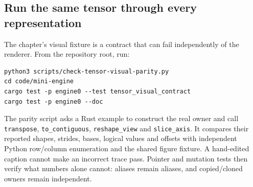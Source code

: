 \documentclass[
  10pt,
]{article}
\begin{document}
\subsection{Run the same tensor through every
representation}\label{run-the-same-tensor-through-every-representation}

The chapter's visual fixture is a contract that can fail independently
of the renderer. From the repository root, run:

\begin{verbatim}
python3 scripts/check-tensor-visual-parity.py
cd code/mini-engine
cargo test -p engine0 --test tensor_visual_contract
cargo test -p engine0 --doc
\end{verbatim}

The parity script asks a Rust example to construct the real owner and
call \texttt{transpose}, \texttt{to\_contiguous}, \texttt{reshape\_view}
and \texttt{slice\_axis}. It compares their reported shapes, strides,
bases, logical values and offsets with independent Python row/column
enumeration and the shared figure fixture. A hand-edited caption cannot
make an incorrect trace pass. Pointer and mutation tests then verify
what numbers alone cannot: aliases remain aliases, and copied/cloned
owners remain independent.

\end{document}
